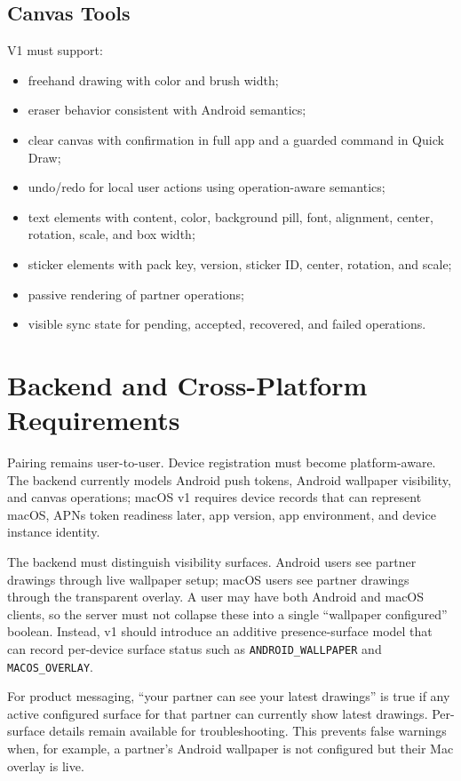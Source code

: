 \documentclass[11pt]{article}
\begin{document}
\subsection{Canvas Tools}

V1 must support:
\begin{itemize}
  \item freehand drawing with color and brush width;
  \item eraser behavior consistent with Android semantics;
  \item clear canvas with confirmation in full app and a guarded command in Quick Draw;
  \item undo/redo for local user actions using operation-aware semantics;
  \item text elements with content, color, background pill, font, alignment, center, rotation, scale, and box width;
  \item sticker elements with pack key, version, sticker ID, center, rotation, and scale;
  \item passive rendering of partner operations;
  \item visible sync state for pending, accepted, recovered, and failed operations.
\end{itemize}

\section{Backend and Cross-Platform Requirements}

Pairing remains user-to-user. Device registration must become platform-aware. The backend currently models Android push tokens, Android wallpaper visibility, and canvas operations; macOS v1 requires device records that can represent macOS, APNs token readiness later, app version, app environment, and device instance identity.

The backend must distinguish visibility surfaces. Android users see partner drawings through live wallpaper setup; macOS users see partner drawings through the transparent overlay. A user may have both Android and macOS clients, so the server must not collapse these into a single ``wallpaper configured'' boolean. Instead, v1 should introduce an additive presence-surface model that can record per-device surface status such as \texttt{ANDROID\_WALLPAPER} and \texttt{MACOS\_OVERLAY}.

For product messaging, ``your partner can see your latest drawings'' is true if any active configured surface for that partner can currently show latest drawings. Per-surface details remain available for troubleshooting. This prevents false warnings when, for example, a partner's Android wallpaper is not configured but their Mac overlay is live.
\end{document}
